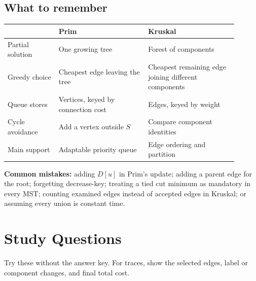 \documentclass[11pt,letterpaper]{article}
\begin{document}
\subsection{What to remember}
\begin{center}\small
\begin{tabular}{p{0.20\linewidth}p{0.35\linewidth}p{0.35\linewidth}}
\toprule
 & \textbf{Prim} & \textbf{Kruskal} \\
\midrule
Partial solution & One growing tree & Forest of components \\
Greedy choice & Cheapest edge leaving the tree & Cheapest remaining edge joining different components \\
Queue stores & Vertices, keyed by connection cost & Edges, keyed by weight \\
Cycle avoidance & Add a vertex outside $S$ & Compare component identities \\
Main support & Adaptable priority queue & Edge ordering and partition \\
\bottomrule
\end{tabular}
\end{center}
\textbf{Common mistakes:} adding $D[u]$ in Prim's update; adding a parent edge for the root; forgetting decrease-key; treating a tied cut minimum as mandatory in every MST; counting examined edges instead of accepted edges in Kruskal; or assuming every union is constant time.

\newpage
\section{Study Questions}
Try these without the answer key. For traces, show the selected edges, label or component changes, and final total cost.
\end{document}
